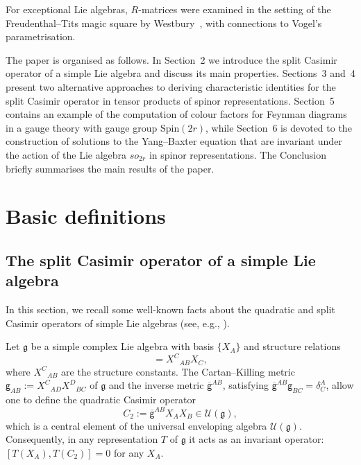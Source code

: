 \documentclass[a4paper]{article}
\newcommand{\kg}{\mathsf{g}}
\newcommand{\mcU}{\mathcal{U}}
\newcommand{\Spin}{\mathrm{Spin}}
\renewcommand{\=}{\ =\ }
\newcommand{\okg}{\overline{\mathsf{g}}}
\newcommand{\mfg}{\mathfrak{g}}
\numberwithin{equation}{section}
\theoremstyle{remark}
\begin{document}
For exceptional Lie algebras, $R$-matrices were examined in the setting of the Freudenthal–Tits magic square by Westbury~\cite{West}, with connections to Vogel’s parametrisation.

The paper is organised as follows. In Section~2 we introduce the split Casimir operator of a simple Lie algebra and discuss its main properties. Sections~3 and~4 present two alternative approaches to deriving characteristic identities for the split Casimir operator in tensor products of spinor representations. Section~5 contains an example of the computation of colour factors for Feynman diagrams in a gauge theory with gauge group $\Spin(2r)$, while Section~6 is devoted to the construction of solutions to the Yang--Baxter equation that are invariant under the action of the Lie algebra $so_{2r}$ in spinor representations. The Conclusion briefly summarises the main results of the paper.

\section{Basic definitions}
\subsection{The split Casimir operator of a simple Lie algebra}

In this section, we recall some well-known facts about the quadratic and split Casimir operators of simple Lie algebras (see, e.g., \cite{IsKrad2,IsKrPrad3,IsRu1}).

Let $\mfg$ be a simple complex Lie algebra with basis $\{X_A\}$ and structure relations
\begin{equation}
[X_A,X_B]=X^{C}{}_{AB} X_C,
\end{equation}
where $X^{C}{}_{AB}$ are the structure constants. The Cartan--Killing metric $\kg_{AB}:=X^{C}{}_{AD}X^{D}{}_{BC}$ of $\mfg$ and the inverse metric $\okg^{AB}$, satisfying $\okg^{AB}\kg_{BC}=\delta^A_C$, allow one to define the quadratic Casimir operator
\begin{equation}\label{C_2 definition}
C_2:=\okg^{AB}X_AX_B\in\mcU(\mfg),
\end{equation}
which is a central element of the universal enveloping algebra $\mcU(\mfg)$. Consequently, in any representation $T$ of $\mfg$ it acts as an invariant operator: $[T(X_A),T(C_2)]=0$ for any $X_A$.
\end{document}
